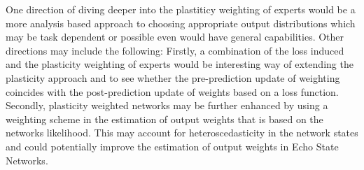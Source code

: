 One direction of diving deeper into the plastiticy weighting of experts would be a more analysis based approach to choosing appropriate output distributions which may be task dependent or possible even would have general capabilities. Other directions may include the following: Firstly, a combination of the loss induced and the plasticity weighting of experts would be interesting way of extending the plasticity approach and to see whether the pre-prediction update of weighting coincides with the post-prediction update of weights based on a loss function. Secondly, plasticity weighted networks may be further enhanced by using a weighting scheme in the estimation of output weights that is based on the networks likelihood. This may account for heteroscedasticity in the network states and could potentially improve the estimation of output weights in Echo State Networks.

\newpage